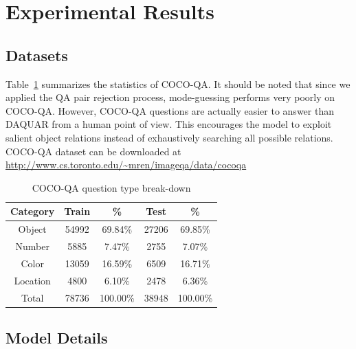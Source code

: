 \documentclass{article}
\renewcommand{\*}[1]{\textbf{#1}}
\begin{document}
\section{Experimental Results}
\subsection{Datasets}
Table~\ref{tab:dataset_category_stats} summarizes the statistics of 
COCO-QA. It should be noted that since we applied the QA pair rejection 
process, mode-guessing performs very poorly on COCO-QA. However, COCO-QA 
questions are actually easier to answer than DAQUAR from a human point of view. 
This encourages the model to exploit salient object relations instead of 
exhaustively searching all possible relations. COCO-QA dataset can be 
downloaded at \url{http://www.cs.toronto.edu/~mren/imageqa/data/cocoqa}

\begin{table}
\caption{COCO-QA question type break-down}
\vskip 0.15in
\label{tab:dataset_category_stats}
\begin{center}
\begin{small}
\begin{sc}
\begin{tabular}{c c c c c}
\hline
\abovespace
\belowspace
Category & Train & \%       & Test  & \%       \\
\hline
\abovespace
Object   & 54992 & 69.84\%  & 27206 & 69.85\%  \\
Number   & 5885  & 7.47\%   & 2755  & 7.07\%   \\
Color    & 13059 & 16.59\%  & 6509  & 16.71\%  \\
\belowspace
Location & 4800  & 6.10\%   & 2478  & 6.36\%   \\
\hline
\abovespace
\belowspace
Total    & 78736 & 100.00\% & 38948 & 100.00\% \\
\hline
\end{tabular}
\end{sc}
\end{small}
\end{center}
\end{table}

\subsection{Model Details}
\end{document}
